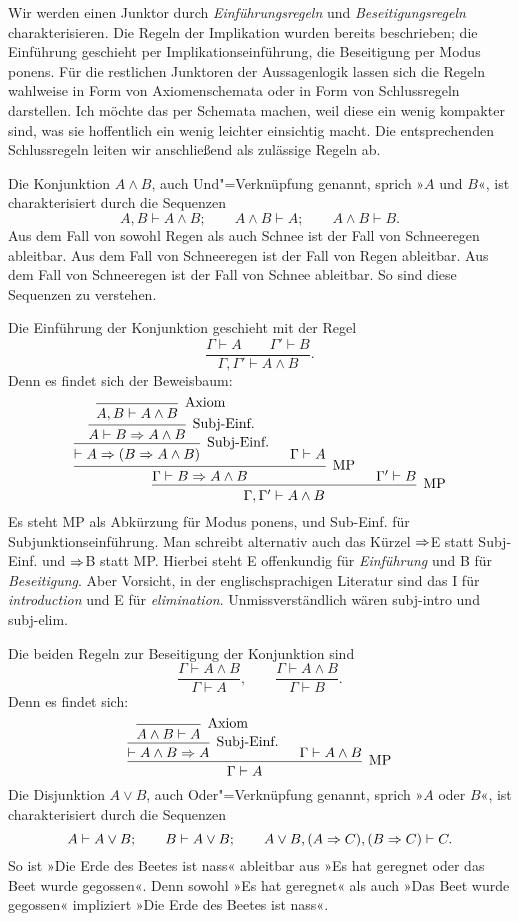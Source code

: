 Wir werden einen Junktor durch \emph{Einführungsregeln}%
 und
\emph{Beseitigungsregeln}
charakterisieren. Die Regeln der Implikation
wurden bereits beschrieben; die Einführung geschieht per
Implikationseinführung, die Beseitigung per Modus ponens.
Für die restlichen Junktoren der Aussagenlogik lassen sich die Regeln
wahlweise in Form von Axiomenschemata oder in Form von Schlussregeln
darstellen. Ich möchte das per Schemata machen, weil diese ein wenig
kompakter sind, was sie hoffentlich ein wenig leichter einsichtig macht.
Die entsprechenden Schlussregeln leiten wir anschließend als zulässige
Regeln ab.

Die Konjunktion $A\land B$, auch Und"=Verknüpfung
genannt, sprich »$A$ und $B$«, ist charakterisiert durch die Sequenzen
\[A,B\vdash A\land B;\qquad A\land B\vdash A;\qquad A\land B\vdash B.\]
Aus dem Fall von sowohl Regen als auch Schnee ist der Fall von
Schneeregen ableitbar. Aus dem Fall von Schneeregen ist der Fall
von Regen ableitbar. Aus dem Fall von Schneeregen ist der Fall
von Schnee ableitbar. So sind diese Sequenzen zu verstehen.

Die Einführung der Konjunktion geschieht mit der Regel
\[\dfrac{\Gamma\vdash A\qquad\Gamma'\vdash B}{\Gamma,\Gamma'\vdash A\land B}.\]
Denn es findet sich der Beweisbaum:
\[\begin{prooftree}
        \infer0[Axiom]{A,B\vdash A\land B}
      \infer1[Subj-Einf.]{A\vdash B\cond A\land B}
    \infer1[Subj-Einf.]{\vdash A\cond (B\cond A\land B)}
    \hypo{\Gamma\vdash A}
  \infer2[MP]{\Gamma\vdash B\cond A\land B}
  \hypo{\Gamma'\vdash B}
\infer2[MP]{\Gamma,\Gamma'\vdash A\land B}
\end{prooftree}\]
Es steht MP als Abkürzung für Modus ponens, und Sub-Einf. für
Subjunktionseinführung. Man schreibt alternativ auch das Kürzel
$\Rightarrow$E statt Subj-Einf. und $\Rightarrow$B statt MP. Hierbei steht E
offenkundig für \emph{Einführung} und B für \emph{Beseitigung}. Aber
Vorsicht, in der englischsprachigen Literatur sind das I für
\emph{introduction} und E für \emph{elimination}.
Unmissverständlich wären subj-intro und subj-elim.

Die beiden Regeln zur Beseitigung der Konjunktion sind
\[\dfrac{\Gamma\vdash A\land B}{\Gamma\vdash A},
\qquad\dfrac{\Gamma\vdash A\land B}{\Gamma\vdash B}.\]
Denn es findet sich:
\[\begin{prooftree}
    \infer0[Axiom]{A\land B\vdash A}
  \infer1[Subj-Einf.]{\vdash A\land B\cond A}
  \hypo{\Gamma\vdash A\land B}
\infer2[MP]{\Gamma\vdash A}
\end{prooftree}\]
Die Disjunktion $A\lor B$, auch Oder"=Verknüpfung
genannt, sprich »$A$ oder $B$«, ist charakterisiert durch die Sequenzen
\[A\vdash A\lor B;\qquad B\vdash A\lor B;\qquad
A\lor B, (A\Rightarrow C), (B\Rightarrow C)\vdash C.\]
So ist »Die Erde des Beetes ist nass« ableitbar aus »Es hat geregnet
oder das Beet wurde gegossen«. Denn sowohl »Es hat geregnet« als auch
»Das Beet wurde gegossen« impliziert »Die Erde des Beetes ist nass«.

